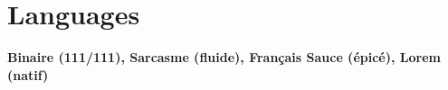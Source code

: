 \section{Languages}
\resumeSubHeadingListStart
\item \textbf{Binaire (111/111), Sarcasme (fluide), Français Sauce (épicé), Lorem (natif)}
\resumeSubHeadingListEnd
